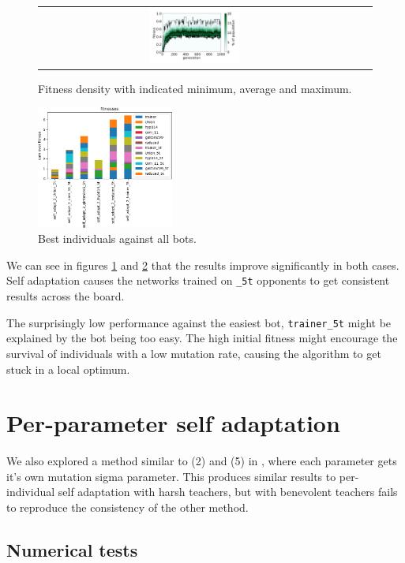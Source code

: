 \documentclass[11pt,a4paper]{scrartcl}
\begin{document}
\begin{figure}[H]
\begin{tabular}{ccc}
\includegraphics[width=0.3\textwidth]{img/self_adapt_1_trainer_5t.png}
\end{tabular}
\caption{Fitness density with indicated minimum, average and maximum.}
\label{fig:self_adapt_1_5t}
\end{figure}

\begin{figure}[H]
\center
\includegraphics[width=0.4\textwidth]{img/self_adapt_2_5t.png}
\caption{Best individuals against all bots.}
\label{fig:self_adapt_1_5t_aa}
\end{figure}

We can see in figures \ref{fig:self_adapt_1_5t} and \ref{fig:self_adapt_1_5t_aa} that the results improve significantly in both cases. Self adaptation causes the networks trained on \texttt{\_5t} opponents to get consistent results across the board.

The surprisingly low performance against the easiest bot, \texttt{trainer\_5t} might be explained by the bot being too easy. The high initial fitness might encourage the survival of individuals with a low mutation rate, causing the algorithm to get stuck in a local optimum.

\section{Per-parameter self adaptation}

We also explored a method similar to (2) and (5) in \cite{self_adapt}, where each parameter gets it's own mutation sigma parameter. This produces similar results to per-individual self adaptation with harsh teachers, but with benevolent teachers fails to reproduce the consistency of the other method.

\subsection{Numerical tests}
\end{document}

